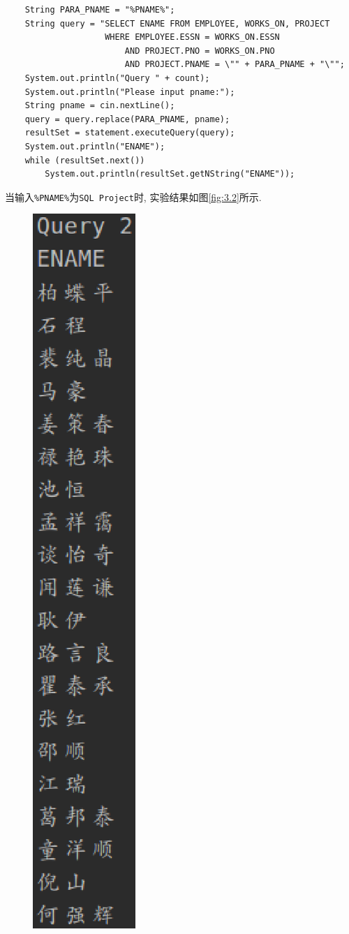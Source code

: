 \documentclass{ML}
\begin{document}
\begin{enumerate}
\begin{verbatim}
    String PARA_PNAME = "%PNAME%";
    String query = "SELECT ENAME FROM EMPLOYEE, WORKS_ON, PROJECT 
                    WHERE EMPLOYEE.ESSN = WORKS_ON.ESSN 
                        AND PROJECT.PNO = WORKS_ON.PNO 
                        AND PROJECT.PNAME = \"" + PARA_PNAME + "\"";
    System.out.println("Query " + count);
    System.out.println("Please input pname:");
    String pname = cin.nextLine();
    query = query.replace(PARA_PNAME, pname);
    resultSet = statement.executeQuery(query);
    System.out.println("ENAME");
    while (resultSet.next())
        System.out.println(resultSet.getNString("ENAME"));
    \end{verbatim}
    当输入\texttt{\%PNAME\%}为\texttt{SQL Project}时, 实验结果如图\ref{fig:3.2}所示.
    \begin{figure}[H]
        \centering
        \includegraphics[scale = 0.5, bb= 0 0 88 571]{media/3.2.eps}

\end{figure}
\end{enumerate}
\end{document}
